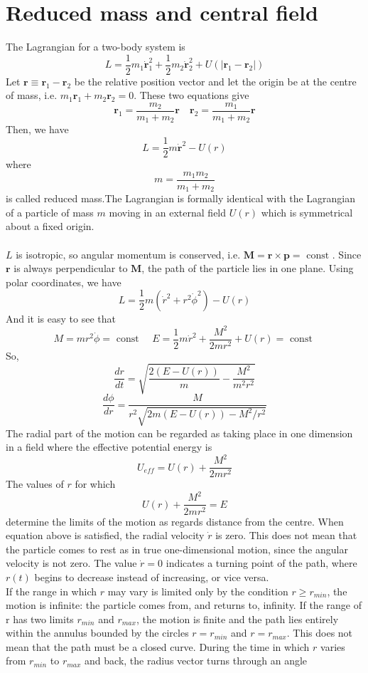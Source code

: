 \documentclass[cyan]{elegantnote}
\begin{document}
\section{Reduced mass and central field}
The Lagrangian for a two-body system is
\[L = \frac{1}{2} m_1 \dot{\bm{r}}_1^2 + \frac{1}{2} m_2 \dot{\bm{r}}_2^2 + U(|\bm{r}_1 - \bm{r}_2|)\]
Let $\bm{r} \equiv \bm{r}_1 -\bm{r}_2 $ be the relative position vector and let the origin be at the centre of mass, i.e. $m_1\bm{r}_1 + m_2\bm{r}_2 = 0$. These two equations give
\[\bm{r}_1 = \frac{m_2}{m_1+m_2}\bm{r} \quad \bm{r}_2 = \frac{m_1}{m_1+m_2}\bm{r}\]
Then, we have
\[L = \frac{1}{2} m \dot{\bm{r}}^2 - U(r)\]
where
\[m = \frac{m_1m_2}{m_1+m_2}\]
is called reduced mass.The Lagrangian is formally identical with the Lagrangian of a particle of mass $m$ moving in an external field $U(r)$ which is symmetrical about a fixed origin. \\ \\
$L$ is isotropic, so angular momentum is conserved, i.e. $\bm{M} = \bm{r} \times \bm{p} = \mbox{ const }$. Since $\bm{r}$ is always perpendicular to $\bm{M}$, the path of the particle lies in one plane. Using polar coordinates, we have
\[L = \frac{1}{2}m(\dot{r}^2 + r^2 \dot{\phi}^2)-U(r)\]
And it is easy to see that
\[M = mr^2\dot{\phi} = \mbox{ const } \quad E = \frac{1}{2}m \dot{r}^2 + \frac{M^2}{2mr^2} + U(r) = \mbox{ const }\]
So,
\[\frac{dr}{dt} = \sqrt{\frac{2(E-U(r))}{m} - \frac{M^2}{m^2r^2}}\]
\[\frac{d\phi}{dr} = \frac{M}{r^2 \sqrt{2m(E-U(r))-M^2/r^2}}\]
The radial part of the motion can be regarded as taking place in one dimension in a field where the effective potential energy is
\[U_{eff} = U(r) + \frac{M^2}{2mr^2}\]
The values of $r$ for which
\[U(r) + \frac{M^2}{2mr^2} = E\]
determine the limits of the motion as regards distance from the centre. When equation above is satisfied, the radial velocity $\dot{r}$ is zero. This does not mean that the particle comes to rest as in true one-dimensional motion, since the angular velocity is not zero. The value $\dot{r} = 0$ indicates a turning point of the path, where $r(t)$ begins to decrease instead of increasing, or vice versa.\\ 
If the range in which $r$ may vary is limited only by the condition $r \ge r_{min}$, the motion is infinite: the particle comes from, and returns to, infinity.
If the range of r has two limits $r_{min}$ and $r_{max}$, the motion is finite and the path lies entirely within the annulus bounded by the circles $r = r_{min}$ and $r = r_{max}$. This does not mean that the path must be a closed curve. During the time in which $r$ varies from $r_{min}$ to $r_{max}$ and back, the radius vector turns through an angle
\end{document}

